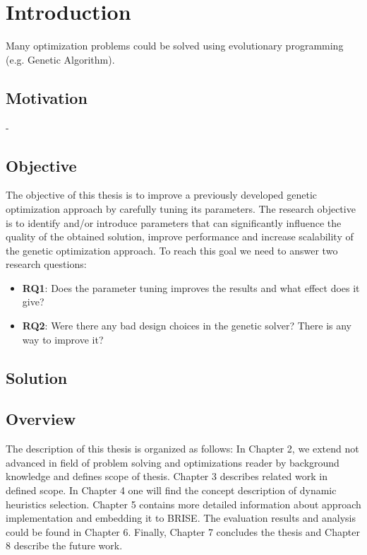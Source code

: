 \chapter{Introduction}\label{intro}

Many optimization problems could be solved using evolutionary programming (e.g. Genetic Algorithm). 

\section{Motivation}
- 


\section{Objective}
The objective of this thesis is to improve a previously developed genetic optimization approach by carefully tuning its parameters. The research objective is to identify and/or introduce parameters that can significantly influence the quality of the obtained solution, improve performance and increase scalability of the genetic optimization approach. To reach this goal we need to answer two research questions:
\begin{itemize}
	\item \textbf{RQ1}: Does the parameter tuning improves the results and what effect does it give?
	\item \textbf{RQ2}: Were there any bad design choices in the genetic solver? There is any way to improve it?
\end{itemize}

\section{Solution}


  	
\section{Overview}
The description of this thesis is organized as follows: In Chapter 2, we extend not advanced in field of problem solving and optimizations reader by background knowledge and defines scope of thesis. Chapter 3 describes related work in defined scope. In Chapter 4 one will find the concept description of dynamic heuristics selection. Chapter 5 contains more detailed information about approach implementation and  embedding it to BRISE. The evaluation results and analysis could be found in Chapter 6. Finally, Chapter 7 concludes the thesis and Chapter 8 describe the future work.
